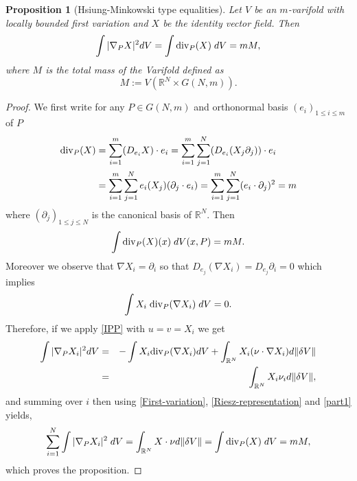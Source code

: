 \documentclass[12pt,english]{smfart} %
\newtheorem{proposition}[theorem]{Proposition}
\theoremstyle{remark}
\newcommand{\R}{\mathbb{R}}
\begin{document}
\medskip\begin{proposition}[Hsiung-Minkowski type equalities]  Let $V$ be an $m$-varifold with locally bounded first variation and $X$ be the identity vector field. Then 
\begin{eqnarray}
 \int |\nabla_P X|^2 dV =  \int {\rm div}_P(X) \;d V =m M,  \label{eq1}
  \end{eqnarray}
 where   $M$ is the total mass of the Varifold defined as
$$M:= V(\mathbb{R}^N\times G(N,m)).$$
\end{proposition}

\begin{proof} We first  write for any $P\in G(N,m)$ and orthonormal basis $(e_i)_{1\leqslant i\leqslant m}$ of $P$
\begin{align*} 
{\rm div}_P(X)&=\sum_{i=1}^m(D_{e_i}X)\cdot e_i=\sum_{i=1}^m\sum_{j=1}^N(D_{e_i}(X_j\partial_j))\cdot e_i\notag\\
&=\sum_{i=1}^m\sum_{j=1}^Ne_i(X_j)(\partial_j\cdot e_i)=\sum_{i=1}^m\sum_{j=1}^N (e_i\cdot\partial_j)^2=m
\end{align*}
where $(\partial_j)_{1\leqslant j\leqslant N}$ is the canonical basis of $\R^N$. Then
\begin{equation}\label{part1}
\int {\rm div}_P(X)(x) \;d V(x,P)=mM.
\end{equation} 
Moreover we observe that $\nabla X_i=\partial_i$ so that $D_{e_j}(\nabla X_i)=D_{e_j}\partial_i=0$ which implies 
$$\int  X_i \; {\rm div}_P(\nabla X_i) \; dV=0.$$
Therefore, if  we apply \eqref{IPP} with $u=v=X_i$ we get 
 \begin{eqnarray}
 \int  |\nabla_P X_i |^2dV &=&-\int  X_i{\rm div}_P(\nabla X_i)dV+\int_{\R^N}X_i(\nu\cdot\nabla X_i)d\|\delta V\| \notag \\
 &=&\int_{\R^N}X_i\nu_id\|\delta V\|,\notag 
 \end{eqnarray}
and summing over $i$ then using \eqref{First-variation}, \eqref{Riesz-representation} and \eqref{part1} yields,  
\begin{eqnarray}
\sum_{i=1}^N \int |\nabla_P X_i |^2  \;dV =\int_{\R^N}X\cdot\nu d\|\delta V\|= \int {\rm div}_P(X) \;d V=mM , \notag
 \end{eqnarray}
which proves the proposition.
\end{proof}
\end{document}
